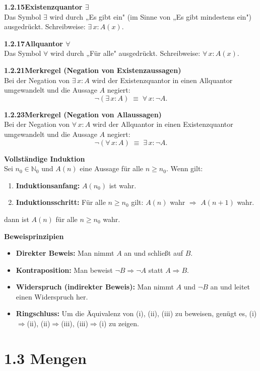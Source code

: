 \documentclass[a4paper,12pt]{article}
\newcommand{\gentry}[3]{%
  \noindent\textbf{#1\quad #2}\nopagebreak\\[0.2em]
  #3\par\smallskip
}
\begin{document}
\gentry{1.2.15}{Existenzquantor $\exists$}{%
  Das Symbol $\exists$ wird durch „Es gibt ein" (im Sinne von „Es gibt
  mindestens ein") ausgedrückt. Schreibweise: $\exists\,x : A(x)$.
}

\gentry{1.2.17}{Allquantor $\forall$}{%
  Das Symbol $\forall$ wird durch „Für alle" ausgedrückt.
  Schreibweise: $\forall\,x : A(x)$.
}

\gentry{1.2.21}{Merkregel (Negation von Existenzaussagen)}{%
  Bei der Negation von $\exists\,x : A$ wird der Existenzquantor in einen
  Allquantor umgewandelt und die Aussage $A$ negiert:
  \[
    \lnot(\exists\,x : A) \;\equiv\; \forall\,x : \lnot A.
  \]
}

\gentry{1.2.23}{Merkregel (Negation von Allaussagen)}{%
  Bei der Negation von $\forall\,x : A$ wird der Allquantor in einen
  Existenzquantor umgewandelt und die Aussage $A$ negiert:
  \[
    \lnot(\forall\,x : A) \;\equiv\; \exists\,x : \lnot A.
  \]
}

\gentry{}{Vollständige Induktion}{%
  Sei $n_0 \in \mathbb{N}_0$ und $A(n)$ eine Aussage für alle $n \ge n_0$.
  Wenn gilt:
  \begin{enumerate}[label=(\roman*),topsep=2pt,itemsep=1pt]
    \item \textbf{Induktionsanfang:} $A(n_0)$ ist wahr.
    \item \textbf{Induktionsschritt:} Für alle $n \ge n_0$ gilt:
          $A(n)$ wahr $\Rightarrow$ $A(n+1)$ wahr.
  \end{enumerate}
  dann ist $A(n)$ für alle $n \ge n_0$ wahr.
}

\gentry{}{Beweisprinzipien}{%
  \begin{itemize}[topsep=2pt,itemsep=1pt]
    \item \textbf{Direkter Beweis:} Man nimmt $A$ an und schließt auf $B$.
    \item \textbf{Kontraposition:} Man beweist $\lnot B \Rightarrow \lnot A$
          statt $A \Rightarrow B$.
    \item \textbf{Widerspruch (indirekter Beweis):} Man nimmt $A$ und
          $\lnot B$ an und leitet einen Widerspruch her.
    \item \textbf{Ringschluss:} Um die Äquivalenz von (i), (ii), (iii) zu
          beweisen, genügt es, (i)$\Rightarrow$(ii), (ii)$\Rightarrow$(iii),
          (iii)$\Rightarrow$(i) zu zeigen.
  \end{itemize}
}

\section*{1.3 \quad Mengen}
\end{document}
